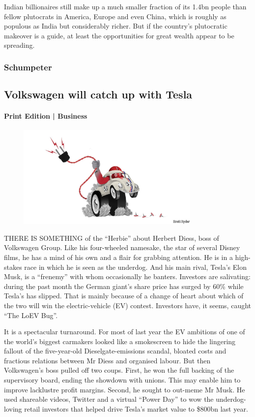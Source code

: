 \documentclass{article}
\begin{document}
Indian billionaires still make up a much smaller fraction of its 1.4bn people than fellow plutocrats in America, Europe and even China, which is roughly as populous as India but considerably richer. But if the country's plutocratic makeover is a guide, at least the opportunities for great wealth appear to be spreading. {} 
\clearpage
\subsubsection{Schumpeter }
\subsection{Volkswagen will catch up with Tesla }
\paragraph{Print Edition | Business  \quad \color{gray}{Mar 27th 2021 }}
\begin{figure}[h]
\centering
\includegraphics[width=0.8\textwidth]{images/20210327_WBD000_0.jpg}
\end{figure}
\lettrine{T}HERE IS SOMETHING of the ``Herbie'' about Herbert Diess, boss of Volkswagen Group. Like his four-wheeled namesake, the star of several Disney films, he has a mind of his own and a flair for grabbing attention. He is in a high-stakes race in which he is seen as the underdog. And his main rival, Tesla's Elon Musk, is a ``frenemy'' with whom occasionally he banters. Investors are salivating: during the past month the German giant's share price has surged by 60\% while Tesla's has slipped. That is mainly because of a change of heart about which of the two will win the electric-vehicle (EV) contest. Investors have, it seems, caught ``The LoEV Bug''. 

It is a spectacular turnaround. For most of last year the EV ambitions of one of the world's biggest carmakers looked like a smokescreen to hide the lingering fallout of the five-year-old Dieselgate-emissions scandal, bloated costs and fractious relations between Mr Diess and organised labour. But then Volkswagen's boss pulled off two coups. First, he won the full backing of the supervisory board, ending the showdown with unions. This may enable him to improve lacklustre profit margins. Second, he sought to out-meme Mr Musk. He used shareable videos, Twitter and a virtual ``Power Day'' to wow the underdog-loving retail investors that helped drive Tesla's market value to \$800bn last year. 
\end{document}

